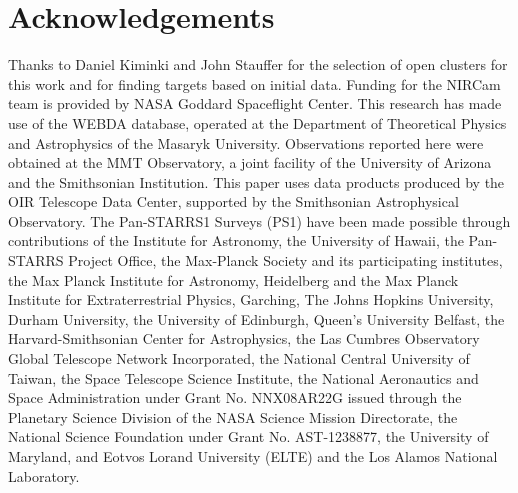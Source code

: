 \documentclass{aastex6}
\begin{document}
\section*{Acknowledgements}

Thanks to Daniel Kiminki and John Stauffer for the selection of open clusters for this work and for finding targets based on initial data.
Funding for the NIRCam team is provided by NASA Goddard Spaceflight Center. This research has made use of the WEBDA database, operated at the Department of Theoretical Physics and Astrophysics of the Masaryk University.
Observations reported here were obtained at the MMT Observatory, a joint facility of the University of Arizona and the Smithsonian Institution.
This paper uses data products produced by the OIR Telescope Data Center, supported by the Smithsonian Astrophysical Observatory.
The Pan-STARRS1 Surveys (PS1) have been made possible through contributions of the Institute for Astronomy, the University of Hawaii, the Pan-STARRS Project Office, the Max-Planck Society and its participating institutes, the Max Planck Institute for Astronomy, Heidelberg and the Max Planck Institute for Extraterrestrial Physics, Garching, The Johns Hopkins University, Durham University, the University of Edinburgh, Queen's University Belfast, the Harvard-Smithsonian Center for Astrophysics, the Las Cumbres Observatory Global Telescope Network Incorporated, the National Central University of Taiwan, the Space Telescope Science Institute, the National Aeronautics and Space Administration under Grant No. NNX08AR22G issued through the Planetary Science Division of the NASA Science Mission Directorate, the National Science Foundation under Grant No. AST-1238877, the University of Maryland, and Eotvos Lorand University (ELTE) and the Los Alamos National Laboratory. 


\end{document}
